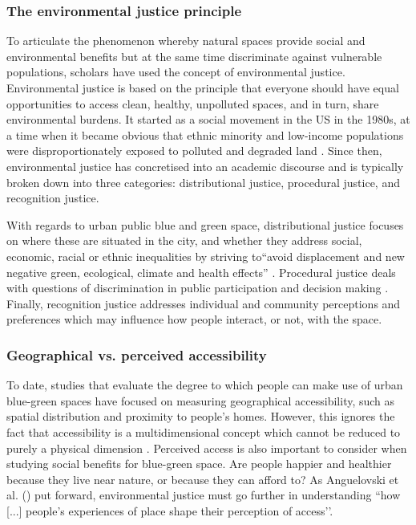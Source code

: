 \documentclass{article}
\begin{document}
\subsubsection{The environmental justice principle}

To articulate the phenomenon whereby natural spaces provide social and environmental benefits but at the same time discriminate against vulnerable populations, scholars have used the concept of environmental justice.
Environmental justice is based on the principle that everyone should have equal opportunities to access clean, healthy, unpolluted spaces, and in turn, share environmental burdens. It started as a social movement in the US in the 1980s, at a time when it became obvious that ethnic minority and low-income populations were disproportionately exposed to polluted and degraded land \parencite{agyeman2016trends}.
Since then, environmental justice has concretised into an academic discourse and is typically broken down into three categories: distributional justice, procedural justice, and recognition justice.

With regards to urban public blue and green space, distributional justice focuses on where these are situated in the city, and whether they address social, economic, racial or ethnic inequalities by striving to``avoid displacement and new negative green, ecological, climate and health effects'' \parencite{anguelovski2020expanding}.
Procedural justice deals with questions of discrimination in public participation and decision making \parencite{anguelovski2020expanding}. 
Finally, recognition justice addresses individual and community perceptions and preferences which may influence how people interact, or not, with the space.

\subsubsection{Geographical vs. perceived accessibility}

To date, studies that evaluate the degree to which people can make use of urban blue-green spaces have focused on measuring geographical accessibility, such as spatial distribution and proximity to people’s homes. %
However, this ignores the fact that accessibility is a multidimensional concept which cannot be reduced to purely a physical dimension \parencite{wang2015physical}. Perceived access is also important to consider when studying social benefits for blue-green space. Are people happier and healthier because they live near nature, or because they can afford to?
As Anguelovski et al. (\citeyear{anguelovski2020expanding}) put forward, environmental justice must go further in understanding ``how [...] people’s experiences of place shape their perception of access’’.
\end{document}
